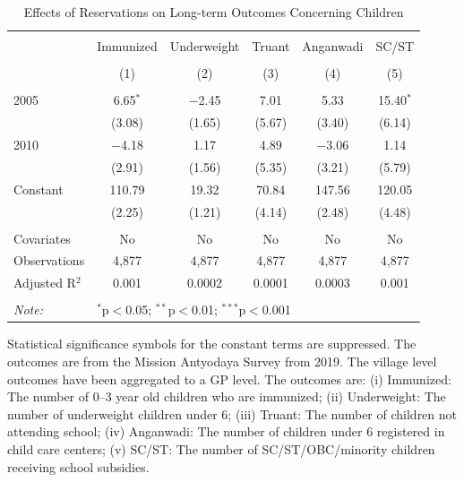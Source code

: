 \begin{table}[!htbp]
\centering
\begin{threeparttable}

  \caption{Effects of Reservations on Long-term Outcomes Concerning Children} 
  \label{raj_shrug_children_05_10} 
\scriptsize 
\begin{tabular}{@{\extracolsep{0pt}}lccccc} 
\\[-1.8ex]\hline 
\hline \\[-1.8ex] 
 & Immunized & Underweight & Truant & Anganwadi & SC/ST \\ 
\\[-1.8ex] & (1) & (2) & (3) & (4) & (5)\\ 
\hline \\[-1.8ex] 
 2005 & 6.65$^{*}$ & $-$2.45 & 7.01 & 5.33 & 15.40$^{*}$ \\ 
  & (3.08) & (1.65) & (5.67) & (3.40) & (6.14) \\ 
  2010 & $-$4.18 & 1.17 & 4.89 & $-$3.06 & 1.14 \\ 
  & (2.91) & (1.56) & (5.35) & (3.21) & (5.79) \\ 
  Constant & 110.79 & 19.32 & 70.84 & 147.56 & 120.05 \\ 
  & (2.25) & (1.21) & (4.14) & (2.48) & (4.48) \\ 
 \hline \\[-1.8ex] 
Covariates & No & No & No & No & No \\ 
Observations & 4,877 & 4,877 & 4,877 & 4,877 & 4,877 \\ 
Adjusted R$^{2}$ & 0.001 & 0.0002 & 0.0001 & 0.0003 & 0.001 \\ 
\hline 
\hline \\[-1.8ex] 
\textit{Note:}  & \multicolumn{5}{l}{$^{*}$p$<$0.05; $^{**}$p$<$0.01; $^{***}$p$<$0.001} \\ 
\end{tabular} 
\begin{tablenotes}[flushleft]
\scriptsize
\item[] Statistical significance symbols for the constant terms are suppressed. The outcomes are from the Mission Antyodaya Survey from 2019.
                   The village level outcomes have been aggregated to a GP level. The outcomes are:
                    (i) Immunized: The number of 0--3 year old children who are immunized;
                    (ii) Underweight: The number of underweight children under 6;
                    (iii) Truant: The number of children not attending school;
                    (iv) Anganwadi: The number of children under 6 registered in child care centers;
                    (v) SC/ST: The number of SC/ST/OBC/minority children receiving school subsidies.
\end{tablenotes}
\end{threeparttable}
\end{table}
